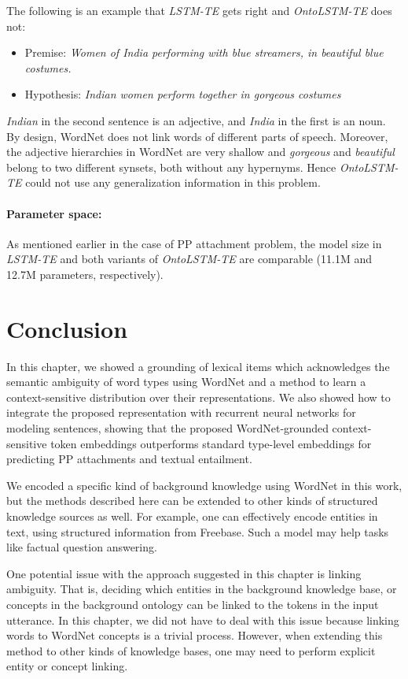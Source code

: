 The following is an example that \textit{LSTM-TE} gets right and \textit{OntoLSTM-TE} does not:
\begin{itemize}
 \item Premise: \textit{Women of India performing with blue streamers, in 
beautiful blue costumes.}
 \item Hypothesis: \textit{Indian women perform together in gorgeous costumes}
\end{itemize}
\textit{Indian} in the second sentence is an adjective, and \textit{India} in 
the first is an noun. By design, WordNet does not link words of different parts 
of speech. Moreover, the adjective hierarchies in WordNet are very shallow and 
\textit{gorgeous} and \textit{beautiful} belong to two different synsets, both 
without any hypernyms. Hence \textit{OntoLSTM-TE} could not use any generalization 
information in this problem.

\paragraph{Parameter space:} As mentioned earlier in the case of PP attachment problem,
the model size in \textit{LSTM-TE} and both variants of \textit{OntoLSTM-TE} are comparable
(11.1M and 12.7M parameters, respectively).

\section{Conclusion}
In this chapter, we showed a grounding of lexical items which acknowledges the semantic ambiguity 
of word types using WordNet and a method to learn a context-sensitive distribution over their representations.
We also showed how to integrate the proposed representation with recurrent neural networks for modeling sentences,
showing that the proposed WordNet-grounded context-sensitive token embeddings outperforms standard type-level embeddings
for predicting PP attachments and textual entailment.

We encoded a specific kind of background knowledge using WordNet in this work, but the methods described here can be extended 
to other kinds of structured knowledge sources as well. For example, one can effectively encode entities in text, using structured information
from Freebase. Such a model may help tasks like factual question answering.

One potential issue with the approach suggested in this chapter is
linking ambiguity. That is, deciding which entities in the background knowledge base, or concepts in the background ontology can be linked to
the tokens in the input utterance. In this chapter, we did not have to deal with this issue because linking words to WordNet concepts is a
trivial process. However, when extending this method to other kinds of knowledge bases, one may need to perform explicit entity or concept linking.